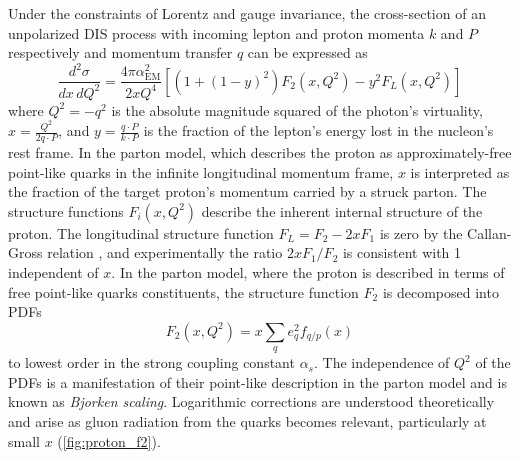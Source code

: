 Under the constraints of Lorentz and gauge invariance, the cross-section of an unpolarized \ac{DIS} process with incoming lepton and proton momenta $k$ and $P$ respectively and momentum transfer $q$ can be expressed as \cite{Tanabashi:2018oca}
\begin{equation}
  \frac{d^2 \sigma}{dx \, dQ^2} = \frac{4\pi\alpha^2_\textrm{EM}}{2xQ^4}\left[ \left(1+(1-y)^2\right) F_2\left(x, Q^2\right) - y^2 F_L \left(x, Q^2\right) \right]
  \label{eq:dis}
\end{equation}
where $Q^2 = -q^2$ is the absolute magnitude squared of the photon's virtuality, $x = \frac{Q^2}{2q \cdot P}$, and $y = \frac{q \cdot P}{k \cdot P}$ is the fraction of the lepton's energy lost in the nucleon's rest frame.
In the parton model, which describes the proton as approximately-free point-like quarks in the infinite longitudinal momentum frame, $x$ is interpreted as the fraction of the target proton's momentum carried by a struck parton.
The structure functions $F_i(x, Q^2)$ describe the inherent internal structure of the proton.
The longitudinal structure function $F_L = F_2 - 2xF_1$ is zero by the Callan-Gross relation \cite{Callan:1969uq}, and experimentally the ratio $2xF_1 / F_2$ is consistent with 1 independent of $x$.
In the parton model, where the proton is described in terms of free point-like quarks constituents, the structure function $F_2$ is decomposed into \acp{PDF}
\begin{equation}
F_2 \left(x, Q^2\right) = x \sum_q e_q^2 f_{q/p}(x)
\end{equation}
to lowest order in the strong coupling constant $\alpha_s$.
The independence of $Q^2$ of the \acp{PDF} is a manifestation of their point-like description in the parton model and is known as \emph{Bjorken scaling}.
Logarithmic corrections are understood theoretically and arise as gluon radiation from the quarks becomes relevant, particularly at small $x$ (\cref{fig:proton_f2}).


